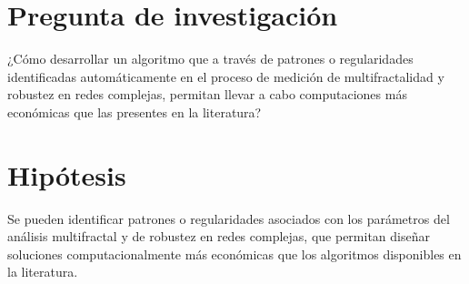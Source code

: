 \section{Pregunta de investigación}

¿Cómo desarrollar un algoritmo que a través de patrones o regularidades identificadas automáticamente en el proceso de medición de multifractalidad y robustez en redes complejas, permitan llevar a cabo computaciones más económicas que las presentes en la literatura?

\section{Hipótesis}

Se pueden identificar patrones o regularidades asociados con los parámetros del análisis multifractal y de robustez en redes complejas, que permitan diseñar soluciones computacionalmente más económicas que los algoritmos disponibles en la literatura.